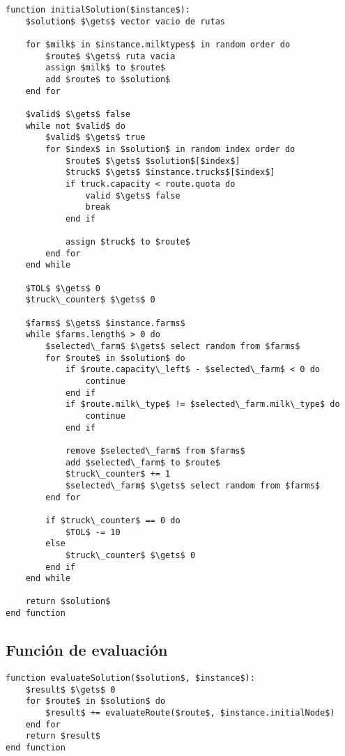 \begin{lstlisting}[style=estiloPseudocodigo]
function initialSolution($instance$):
    $solution$ $\gets$ vector vacio de rutas

    for $milk$ in $instance.milktypes$ in random order do
        $route$ $\gets$ ruta vacia
        assign $milk$ to $route$
        add $route$ to $solution$
    end for

    $valid$ $\gets$ false
    while not $valid$ do
        $valid$ $\gets$ true
        for $index$ in $solution$ in random index order do
            $route$ $\gets$ $solution$[$index$]
            $truck$ $\gets$ $instance.trucks$[$index$]
            if truck.capacity < route.quota do
                valid $\gets$ false
                break
            end if
            
            assign $truck$ to $route$
        end for
    end while

    $TOL$ $\gets$ 0
    $truck\_counter$ $\gets$ 0

    $farms$ $\gets$ $instance.farms$
    while $farms.length$ > 0 do
        $selected\_farm$ $\gets$ select random from $farms$
        for $route$ in $solution$ do
            if $route.capacity\_left$ - $selected\_farm$ < 0 do
                continue
            end if
            if $route.milk\_type$ != $selected\_farm.milk\_type$ do
                continue
            end if

            remove $selected\_farm$ from $farms$
            add $selected\_farm$ to $route$
            $truck\_counter$ += 1
            $selected\_farm$ $\gets$ select random from $farms$
        end for

        if $truck\_counter$ == 0 do
            $TOL$ -= 10
        else
            $truck\_counter$ $\gets$ 0
        end if
    end while

    return $solution$
end function
\end{lstlisting}

\subsection{Función de evaluación}


\begin{lstlisting}[style=estiloPseudocodigo]
function evaluateSolution($solution$, $instance$):
    $result$ $\gets$ 0
    for $route$ in $solution$ do
        $result$ += evaluateRoute($route$, $instance.initialNode$)
    end for
    return $result$
end function
\end{lstlisting}


